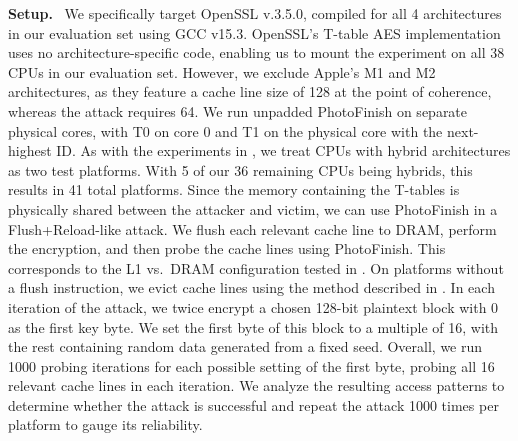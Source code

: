 \documentclass[letterpaper,twocolumn,10pt]{article} %
\newcommand{\paragrabf}[1]{\noindent \textbf{#1.}\ }
\newcommand{\AttackName}{PhotoFinish\xspace}
\newcommand{\PlatformCount}{38\xspace}
\newcommand{\tprobe}{{\fontfamily{cmtt}\selectfont T0}\xspace}
\newcommand{\tref}{{\fontfamily{cmtt}\selectfont T1}\xspace}
\begin{document}
\paragrabf{Setup}
We specifically target OpenSSL v.3.5.0, compiled for all \num{4} architectures in our evaluation set using GCC v15.3.
OpenSSL's T-table AES implementation uses no architecture-specific code, enabling us to mount the experiment on all \PlatformCount CPUs in our evaluation set.
However, we exclude Apple's M1 and M2 architectures, as they feature a cache line size of \SI{128}{\byte} at the point of coherence, whereas the attack requires \SI{64}{\byte}.
We run unpadded \AttackName on separate physical cores, with \tprobe on core 0 and \tref on the physical core with the next-highest ID.
As with the experiments in , we treat CPUs with hybrid architectures as two test platforms.
With \num{5} of our \num{36} remaining CPUs being hybrids, this results in \num{41} total platforms.
Since the memory containing the T-tables is physically shared between the attacker and victim, we can use \AttackName in a Flush+Reload-like attack.
We flush each relevant cache line to DRAM, perform the encryption, and then probe the cache lines using \AttackName.
This corresponds to the L1 vs.\ DRAM configuration tested in .
On platforms without a flush instruction, we evict cache lines using the method described in .
In each iteration of the attack, we twice encrypt a chosen 128-bit plaintext block with \num{0} as the first key byte.
We set the first byte of this block to a multiple of 16, with the rest containing random data generated from a fixed seed.
Overall, we run \num{1000} probing iterations for each possible setting of the first byte, probing all \num{16} relevant cache lines in each iteration.
We analyze the resulting access patterns to determine whether the attack is successful and repeat the attack \num{1000} times per platform to gauge its reliability.
\end{document}
